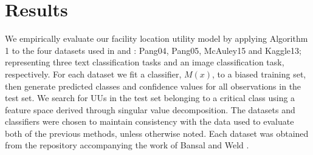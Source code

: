 \documentclass[10pt, conference]{IEEEtran}
\begin{document}
\section{Results}

We empirically evaluate our facility location utility model by applying Algorithm 1 to the four datasets used in \cite{Lakkaraju2016} and \cite{Bansal2018}: Pang04, Pang05, McAuley15 and Kaggle13; representing three text classification tasks and an image classification task, respectively.  For each dataset we fit a classifier, $M(x)$, to a biased training set, then generate predicted classes and confidence values for all observations in the test set.  We search for UUs in the test set belonging to a critical class using a feature space derived through singular value decomposition.  The datasets and classifiers were chosen to maintain consistency with the data used to evaluate both of the previous methods, unless otherwise noted.  Each dataset was obtained from the repository accompanying the work of Bansal and Weld \cite{Bansal2018}.

%
\end{document}
